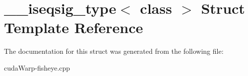 \hypertarget{struct____iseqsig__type}{}\section{\+\_\+\+\_\+iseqsig\+\_\+type$<$ class $>$ Struct Template Reference}
\label{struct____iseqsig__type}


The documentation for this struct was generated from the following file\+:\begin{DoxyCompactItemize}
\item 
cuda\+Warp-\/fisheye.\+cpp\end{DoxyCompactItemize}
